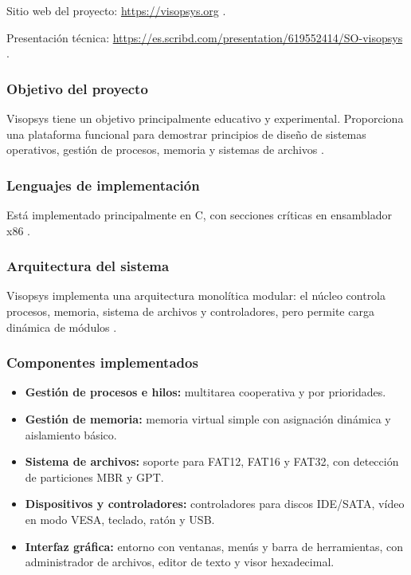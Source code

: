 Sitio web del proyecto: \url{https://visopsys.org} \cite{visopsys_about}.

Presentación técnica: \url{https://es.scribd.com/presentation/619552414/SO-visopsys} \cite{visopsys_scribd}.

\subsubsection{Objetivo del proyecto}
Visopsys tiene un objetivo principalmente educativo y experimental. Proporciona una plataforma funcional para demostrar principios de diseño de sistemas operativos, gestión de procesos, memoria y sistemas de archivos \cite{visopsys_scribd}.

\subsubsection{Lenguajes de implementación}
Está implementado principalmente en C, con secciones críticas en ensamblador x86 \cite{visopsys_sourceforge}.

\subsubsection{Arquitectura del sistema}
Visopsys implementa una arquitectura monolítica modular: el núcleo controla procesos, memoria, sistema de archivos y controladores, pero permite carga dinámica de módulos \cite{visopsys_about}.

\subsubsection{Componentes implementados}
\begin{itemize}
    \item \textbf{Gestión de procesos e hilos:} multitarea cooperativa y por prioridades.
    \item \textbf{Gestión de memoria:} memoria virtual simple con asignación dinámica y aislamiento básico.
    \item \textbf{Sistema de archivos:} soporte para FAT12, FAT16 y FAT32, con detección de particiones MBR y GPT.
    \item \textbf{Dispositivos y controladores:} controladores para discos IDE/SATA, vídeo en modo VESA, teclado, ratón y USB.
    \item \textbf{Interfaz gráfica:} entorno con ventanas, menús y barra de herramientas, con administrador de archivos, editor de texto y visor hexadecimal.
\end{itemize}

